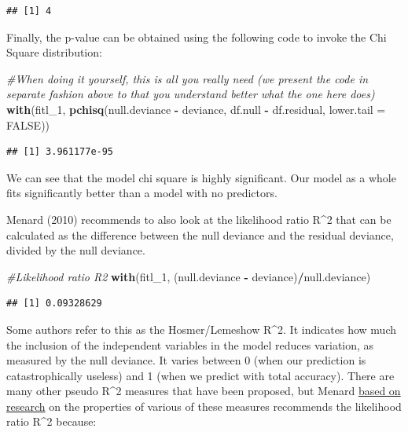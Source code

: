\documentclass[]{book}
\newenvironment{Shaded}{\begin{snugshade}}{\end{snugshade}}
\newcommand{\CommentTok}[1]{\textcolor[rgb]{0.56,0.35,0.01}{\textit{#1}}}
\newcommand{\DataTypeTok}[1]{\textcolor[rgb]{0.13,0.29,0.53}{#1}}
\newcommand{\DecValTok}[1]{\textcolor[rgb]{0.00,0.00,0.81}{#1}}
\newcommand{\KeywordTok}[1]{\textcolor[rgb]{0.13,0.29,0.53}{\textbf{#1}}}
\newcommand{\NormalTok}[1]{#1}
\newcommand{\OperatorTok}[1]{\textcolor[rgb]{0.81,0.36,0.00}{\textbf{#1}}}
\newcommand{\OtherTok}[1]{\textcolor[rgb]{0.56,0.35,0.01}{#1}}
\newcommand{\StringTok}[1]{\textcolor[rgb]{0.31,0.60,0.02}{#1}}
\theoremstyle{definition}
\theoremstyle{definition}
\theoremstyle{definition}
\theoremstyle{remark}
\begin{document}
\begin{verbatim}
## [1] 4
\end{verbatim}

Finally, the p-value can be obtained using the following code to invoke
the Chi Square distribution:

\begin{Shaded}
\begin{Highlighting}[]
\CommentTok{#When doing it yourself, this is all you really need (we present the code in separate fashion above to that you understand better what the one here does)}
\KeywordTok{with}\NormalTok{(fitl_}\DecValTok{1}\NormalTok{, }\KeywordTok{pchisq}\NormalTok{(null.deviance }\OperatorTok{-}\StringTok{ }\NormalTok{deviance, df.null }\OperatorTok{-}\StringTok{ }\NormalTok{df.residual, }\DataTypeTok{lower.tail =} \OtherTok{FALSE}\NormalTok{))}
\end{Highlighting}
\end{Shaded}

\begin{verbatim}
## [1] 3.961177e-95
\end{verbatim}

We can see that the model chi square is highly significant. Our model as
a whole fits significantly better than a model with no predictors.

Menard (2010) recommends to also look at the likelihood ratio R\^{}2
that can be calculated as the difference between the null deviance and
the residual deviance, divided by the null deviance.

\begin{Shaded}
\begin{Highlighting}[]
\CommentTok{#Likelihood ratio R2}
\KeywordTok{with}\NormalTok{(fitl_}\DecValTok{1}\NormalTok{, (null.deviance }\OperatorTok{-}\StringTok{ }\NormalTok{deviance)}\OperatorTok{/}\NormalTok{null.deviance)}
\end{Highlighting}
\end{Shaded}

\begin{verbatim}
## [1] 0.09328629
\end{verbatim}

Some authors refer to this as the Hosmer/Lemeshow R\^{}2. It indicates
how much the inclusion of the independent variables in the model reduces
variation, as measured by the null deviance. It varies between 0 (when
our prediction is catastrophically useless) and 1 (when we predict with
total accuracy). There are many other pseudo R\^{}2 measures that have
been proposed, but Menard
\href{http://www.tandfonline.com/doi/pdf/10.1080/00031305.2000.10474502}{based
on research} on the properties of various of these measures recommends
the likelihood ratio R\^{}2 because:
\end{document}
